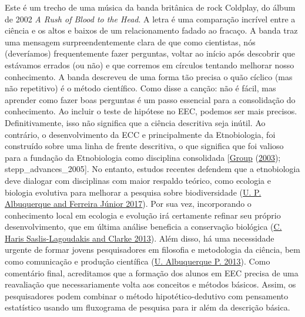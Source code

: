 \documentclass[
]{article}
\begin{document}
Este é um trecho de uma música da banda britânica de rock Coldplay, do álbum de 2002 \emph{A Rush of Blood to the Head}. A letra é uma comparação incrível entre a ciência e os altos e baixos de um relacionamento fadado ao fracaço. A banda traz uma mensagem surpreendentemente clara de que como cientistas, nós (deveríamos) frequentemente fazer perguntas, voltar ao início após descobrir que estávamos errados (ou não) e que corremos em círculos tentando melhorar nosso conhecimento. A banda descreveu de uma forma tão precisa o quão cíclico (mas não repetitivo) é o método científico. Como disse a canção: não é fácil, mas aprender como fazer boas perguntas é um passo essencial para a consolidação do conhecimento. Ao incluir o teste de hipótese no EEC, podemos ser mais precisos. Definitivamente, isso não significa que a ciência descritiva seja inútil. Ao contrário, o desenvolvimento da ECC e principalmente da Etnobiologia, foi construído sobre uma linha de frente descritiva, o que significa que foi valioso para a fundação da Etnobiologia como disciplina consolidada {[}\protect\hyperlink{ref-ethnobiology_working_group_intellectual_2003}{Group} (\protect\hyperlink{ref-ethnobiology_working_group_intellectual_2003}{2003}); stepp\_advances\_2005{]}. No entanto, estudos recentes defendem que a etnobiologia deve dialogar com disciplinas com maior respaldo teórico, como ecologia e biologia evolutiva para melhorar a pesquisa sobre biodiversidade (\protect\hyperlink{ref-albuquerque_what_2017}{U. P. Albuquerque and Ferreira Júnior 2017}). Por sua vez, incorporando o conhecimento local em ecologia e evolução irá certamente refinar seu próprio desenvolvimento, que em última análise beneficia a conservação biológica (\protect\hyperlink{ref-saslis-lagoudakis_ethnobiology:_2013}{C. Haris Saslis-Lagoudakis and Clarke 2013}). Além disso, há uma necessidade urgente de formar jovens pesquisadores em filosofia e metodologia da ciência, bem como comunicação e produção científica (\protect\hyperlink{ref-albuquerque_how_2013}{U. Albuquerque P. 2013}). Como comentário final, acreditamos que a formação dos alunos em EEC precisa de uma reavaliação que necessariamente volta aos conceitos e métodos básicos. Assim, os pesquisadores podem combinar o método hipotético-dedutivo com pensamento estatístico usando um fluxograma de pesquisa para ir além da descrição básica.
\end{document}
